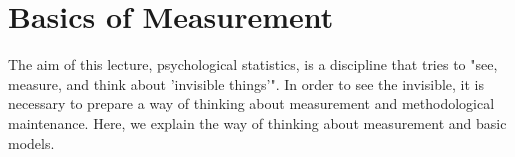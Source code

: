 \documentclass{ltjbook}
\begin{document}
\chapter{Basics of Measurement}
\label{m06_ctt}

The aim of this lecture, psychological statistics, is a discipline that tries to "see, measure, and think about 'invisible things'". In order to see the invisible, it is necessary to prepare a way of thinking about measurement and methodological maintenance. Here, we explain the way of thinking about measurement and basic models.
\end{document}
